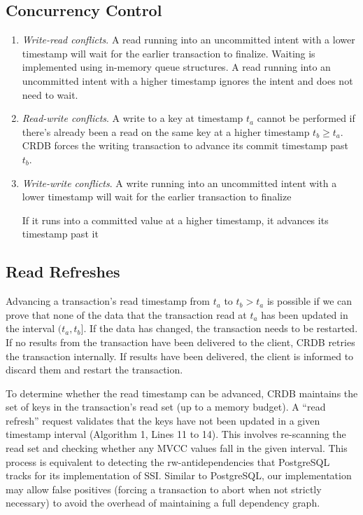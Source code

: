 \documentclass[11pt]{article}
\begin{document}
\subsection{Concurrency Control}
\label{sec:org943b076}
\begin{enumerate}
\item \emph{Write-read conflicts}. A read running into an uncommitted intent with a lower timestamp will wait
for the earlier transaction to finalize. Waiting is implemented using in-memory queue structures. A
read running into an uncommitted intent with a higher timestamp ignores the intent and does not
need to wait.
\item \emph{Read-write conflicts}. A write to a key at timestamp \(t_a\) cannot be performed if there's already been
a read on the same key at a higher timestamp \(t_b\ge t_a\). CRDB forces the writing transaction to
advance its commit timestamp past \(t_b\).
\item \emph{Write-write conflicts}. A write running into an uncommitted intent with a lower timestamp will wait
for the earlier transaction to finalize

If it runs into a committed value at a higher timestamp, it advances its timestamp past it
\end{enumerate}
\subsection{Read Refreshes}
\label{sec:orgc05dfef}
Advancing a transaction's read timestamp from \(t_a\) to \(t_b>t_a\) is possible if we can prove that
none of the data that the transaction read at \(t_a\) has been updated in the interval \((t_a,t_b]\).
If the data has changed, the transaction needs to be restarted. If no results from the transaction
have been delivered to the client, CRDB retries the transaction internally. If results have been
delivered, the client is informed to discard them and restart the transaction.

To determine whether the read timestamp can be advanced, CRDB maintains the set of keys in the
transaction's read set (up to a memory budget). A ``read refresh'' request validates that the keys have
not been updated in a given timestamp interval (Algorithm 1, Lines 11 to 14). This involves
re-scanning the read set and checking whether any MVCC values fall in the given interval. This process
is equivalent to detecting the rw-antidependencies that PostgreSQL tracks for its implementation of
SSI. Similar to PostgreSQL, our implementation may allow false positives (forcing a transaction to
abort when not strictly necessary) to avoid the overhead of maintaining a full dependency graph.
\end{document}
